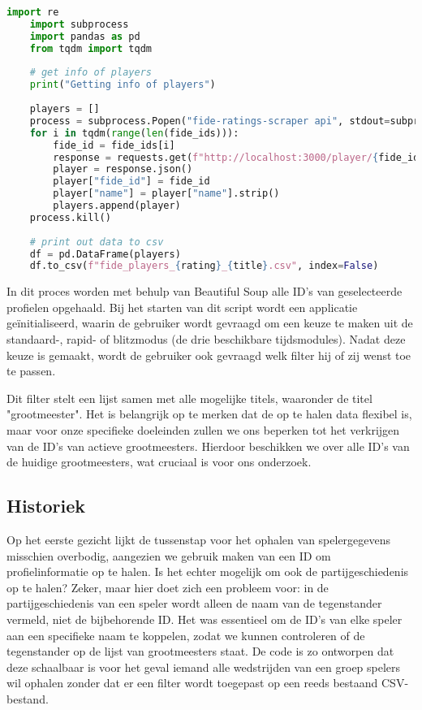 \begin{lstlisting}[language=Python]
    import re
    import subprocess
    import pandas as pd
    from tqdm import tqdm
    
    # get info of players
    print("Getting info of players")
    
    players = []
    process = subprocess.Popen("fide-ratings-scraper api", stdout=subprocess.PIPE, stderr=subprocess.PIPE, shell=True)
    for i in tqdm(range(len(fide_ids))):
        fide_id = fide_ids[i]
        response = requests.get(f"http://localhost:3000/player/{fide_id}/info")
        player = response.json()
        player["fide_id"] = fide_id
        player["name"] = player["name"].strip()
        players.append(player)
    process.kill()
    
    # print out data to csv
    df = pd.DataFrame(players)
    df.to_csv(f"fide_players_{rating}_{title}.csv", index=False)
\end{lstlisting}

In dit proces worden met behulp van Beautiful Soup alle ID's van geselecteerde profielen opgehaald. Bij het starten van dit script wordt een applicatie geïnitialiseerd, waarin de gebruiker wordt gevraagd om een keuze te maken uit de standaard-, rapid- of blitzmodus (de drie beschikbare tijdsmodules). Nadat deze keuze is gemaakt, wordt de gebruiker ook gevraagd welk filter hij of zij wenst toe te passen.

Dit filter stelt een lijst samen met alle mogelijke titels, waaronder de titel "grootmeester". Het is belangrijk op te merken dat de op te halen data flexibel is, maar voor onze specifieke doeleinden zullen we ons beperken tot het verkrijgen van de ID's van actieve grootmeesters. Hierdoor beschikken we over alle ID's van de huidige grootmeesters, wat cruciaal is voor ons onderzoek.\autocite{NumFocus}

\subsection{Historiek}

Op het eerste gezicht lijkt de tussenstap voor het ophalen van spelergegevens misschien overbodig, aangezien we gebruik maken van een ID om profielinformatie op te halen. Is het echter mogelijk om ook de partijgeschiedenis op te halen? Zeker, maar hier doet zich een probleem voor: in de partijgeschiedenis van een speler wordt alleen de naam van de tegenstander vermeld, niet de bijbehorende ID. Het was essentieel om de ID's van elke speler aan een specifieke naam te koppelen, zodat we kunnen controleren of de tegenstander op de lijst van grootmeesters staat. De code is zo ontworpen dat deze schaalbaar is voor het geval iemand alle wedstrijden van een groep spelers wil ophalen zonder dat er een filter wordt toegepast op een reeds bestaand CSV-bestand.

